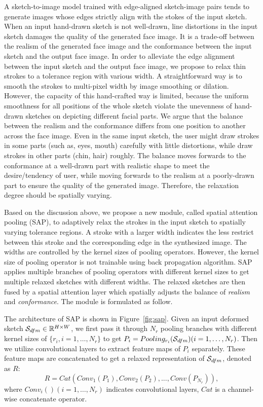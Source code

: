 
 
A sketch-to-image model trained with edge-aligned sketch-image pairs tends to generate images whose edges strictly align with the stokes of the input sketch.
When an input hand-drawn sketch is not well-drawn, line distortions in the input sketch damages the quality of the generated face image. 
It is a trade-off between the realism of the generated face image and the conformance between the input sketch and the output face image.
%
In order to alleviate the edge alignment between the input sketch and the output face image, we propose to relax thin strokes to a tolerance region with various width.
%
A straightforward way is to smooth the strokes to multi-pixel width by image smoothing or dilation. 
%
However, the capacity of this hand-crafted way is limited, because the uniform smoothness for all positions of the whole sketch violate the unevenness of hand-drawn sketches on depicting different facial parts. 
%
We argue that the balance between the realism and the conformance differs from one position to another across the face image. 
Even in the same input sketch, the user might draw strokes in some parts (such as, eyes, mouth) carefully with little distortions, while draw strokes in other parts (chin, hair) roughly. 
The balance moves forwards to the conformance at a well-drawn part with realistic shape to meet the desire/tendency of user, while moving forwards to the realism at a poorly-drawn part to ensure the quality of the generated image.
Therefore, the relaxation degree should be spatially varying. 


Based on the discussion above, we propose a new module, called spatial attention pooling (SAP), to adaptively relax the strokes in the input sketch to spatially varying tolerance regions. 
%
A stroke with a larger width indicates the less restrict between this stroke and the corresponding edge in the synthesized image. The widths are controlled by the kernel sizes of pooling operators. However, the kernel size of pooling operator is not trainable using back propagation algorithm. SAP applies multiple branches of pooling operators with different kernel sizes to get multiple relaxed sketches with different widths. The relaxed sketches are then fused by a spatial attention layer which spatially adjusts the balance of \textit{realism} and \textit{conformance}. The module is formulated as follow.

The architecture of SAP is shown in Figure~\ref{fig:sap}.
Given an input deformed sketch $\mathcal{S}_{dfm} \in {\mathbb{R}}^{H\times W}$, we first pass it through $N_r$ pooling branches with different kernel sizes of $\{r_i, i=1,\ldots, N_r\}$ to get $P_{i}=Pooling_{r_i}(\mathcal{S}_{dfm}) (i=1,\ldots,N_r)$. 
Then we utilize convolutional layers to extract feature maps of $P_i$ separately. These feature maps are concatenated to get a relaxed representation of $\mathcal{S}_{dfm}$, denoted as $R$:
%
\begin{equation}
R=Cat(Conv_1(P_1), Conv_2(P_2),..., Conv(P_{N_r})),
\end{equation}
where $Conv_i() (i=1,\ldots,N_r)$ indicates convolutional layers, $Cat$ is a channel-wise concatenate operator.

